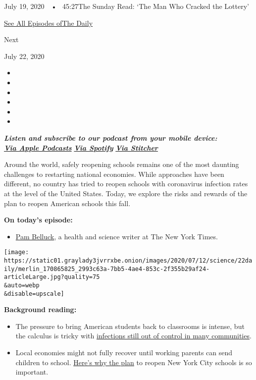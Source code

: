 July 19, 2020~~•~ 45:27The Sunday Read: `The Man Who Cracked the
Lottery'

\href{https://www.nytimes3xbfgragh.onion/column/the-daily}{See All
Episodes ofThe Daily}

Next

July 22, 2020

\begin{itemize}
\item
\item
\item
\item
\item
\item
\end{itemize}

\emph{\textbf{Listen and subscribe to our podcast from your mobile
device:}}\\
\textbf{\href{https://itunes.apple.com/us/podcast/the-daily/id1200361736?mt=2}{\emph{Via
Apple Podcasts}}} \emph{\textbf{\textbar{}}}
\textbf{\href{https://open.spotify.com/show/3IM0lmZxpFAY7CwMuv9H4g?si=SfuMSC55R1qprFsRZU3_zw}{\emph{Via
Spotify}}} \emph{\textbf{\textbar{}}}
\textbf{\href{http://www.stitcher.com/podcast/the-new-york-times/the-daily-10}{\emph{Via
Stitcher}}}

Around the world, safely reopening schools remains one of the most
daunting challenges to restarting national economies. While approaches
have been different, no country has tried to reopen schools with
coronavirus infection rates at the level of the United States. Today, we
explore the risks and rewards of the plan to reopen American schools
this fall.

\textbf{On today's episode:}

\begin{itemize}
\tightlist
\item
  \href{https://www.nytimes3xbfgragh.onion/by/pam-belluck}{Pam Belluck},
  a health and science writer at The New York Times.
\end{itemize}

\texttt{[image: https://static01.graylady3jvrrxbe.onion/images/2020/07/12/science/22daily/merlin\_170865825\_2993c63a-7bb5-4ae4-853c-2f355b29af24-articleLarge.jpg?quality=75\\\&auto=webp\\\&disable=upscale]}

\textbf{Background reading:}

\begin{itemize}
\item
  The pressure to bring American students back to classrooms is intense,
  but the calculus is tricky with
  \href{https://www.nytimes3xbfgragh.onion/2020/07/11/health/coronavirus-schools-reopen.html}{infections
  still out of control in many communities}.
\item
  Local economies might not fully recover until working parents can send
  children to school.
  \href{https://www.nytimes3xbfgragh.onion/2020/07/06/nyregion/nyc-school-reopening-plan.html}{Here's
  why the plan} to reopen New York City schools is so important.
\end{itemize}

